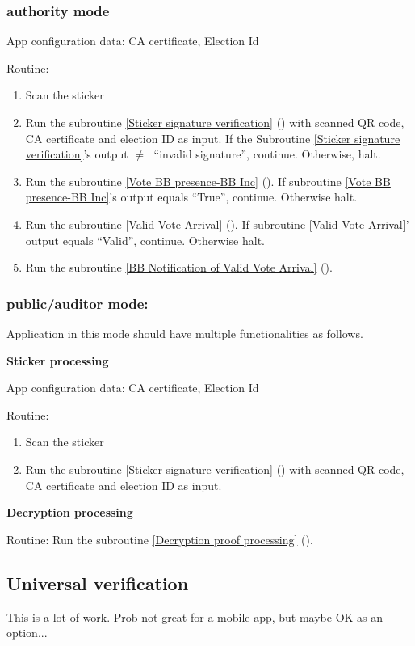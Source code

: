 \documentclass{article}
\begin{document}
\subsubsection{\localVotingCenter{} authority mode}
App configuration data: CA certificate, Election Id

Routine:
\begin{enumerate}
    \item Scan the sticker
    \item Run the subroutine \ref{Sticker signature verification} (\StickersignatureVerification{}) with scanned QR code, CA certificate and election ID as input. If the Subroutine \ref{Sticker signature verification}'s output $\neq\;$ ``invalid signature'', continue. Otherwise, halt.
    \item Run the subroutine \ref{Vote BB presence-BB Inc} (\BBInclusionCheck{}). If subroutine \ref{Vote BB presence-BB Inc}'s output equals ``True'', continue. Otherwise halt.
    \item Run the subroutine \ref{Valid Vote Arrival} (\ValidVoteArrival{}). If subroutine \ref{Valid Vote Arrival}' output equals ``Valid'', continue. Otherwise halt.
    \item Run the subroutine \ref{BB Notification of Valid Vote Arrival} (\ArrivalBBNotification{}).
\end{enumerate}
\subsubsection{\localVotingCenter{}  public/auditor mode:}
Application in this mode should have multiple functionalities as follows.


\textbf{Sticker processing}

App configuration data: CA certificate, Election Id

Routine:
\begin{enumerate}
    \item Scan the sticker
    \item Run the subroutine \ref{Sticker signature verification} (\StickersignatureVerification{}) with scanned QR code, CA certificate and election ID as input.
\end{enumerate}

\textbf{Decryption processing}

Routine: Run the subroutine \ref{Decryption proof processing} (\DecryptionProof{}).

\subsection{Universal verification}
    This is a lot of work. Prob not great for a mobile app, but maybe OK as an option...
\end{document}
